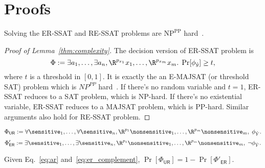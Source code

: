 
\appendix
\section{Proofs}
\begin{lemma}
	\label{thm:complexity}
	Solving the ER-SSAT and RE-SSAT problems are $\mathrm{NP}^{\mathrm{PP}}$ hard~\cite{littman2001stochastic}.
\end{lemma}

\begin{proof}[Proof of Lemma~\ref{thm:complexity}]
	The decision version of ER-SSAT problem is 
	\begin{equation}
		\Phi := \exists a_1,\dots, \exists a_n, \R^{p_{x_1}}x_1, \dots, \R^{p_{x_m}}x_m. \; \Pr[\phi_{\hat{y}}] \geq t,\notag
	\end{equation}
	where $t$ is a threshold in $[0,1]$.
	It is exactly the an E-MAJSAT (or threshold SAT) problem which is $NP^{PP}$ hard~\cite{littman2001stochastic}.
	If there's no random variable and $t=1$, ER-SSAT reduces to a SAT problem, which is NP-hard. If there's no existential variable, ER-SSAT reduces to a MAJSAT problem, which is PP-hard.
	Similar arguments also hold for RE-SSAT problem.
\end{proof}

\begin{equation}
\Phi_{\mathsf{UR}} := \forall \sensitive_1,\dots, \forall \sensitive_n,
\R^{p_{1}}\nonsensitive_1, \dots, \R^{p_{m}}\nonsensitive_m,   \; \phi_{\hat{Y}}.
\label{eq:ar}
\end{equation}
\begin{equation}
\Phi'_{\mathsf{ER}} := \exists \sensitive_1,\dots, \exists \sensitive_n,
\R^{p_{1}}\nonsensitive_1, \dots, \R^{p_{m}}\nonsensitive_m,   \; \neg \phi_{\hat{Y}}.
\label{eq:er_complement}
\end{equation}
\begin{lemma}\label{thm:dual}
	Given Eq.~\eqref{eq:ar} and~\eqref{eq:er_complement},	$ \Pr[\Phi_{\mathsf{UR}}] = 1 - \Pr[\Phi'_{\mathsf{ER}}]  $.
\end{lemma}

